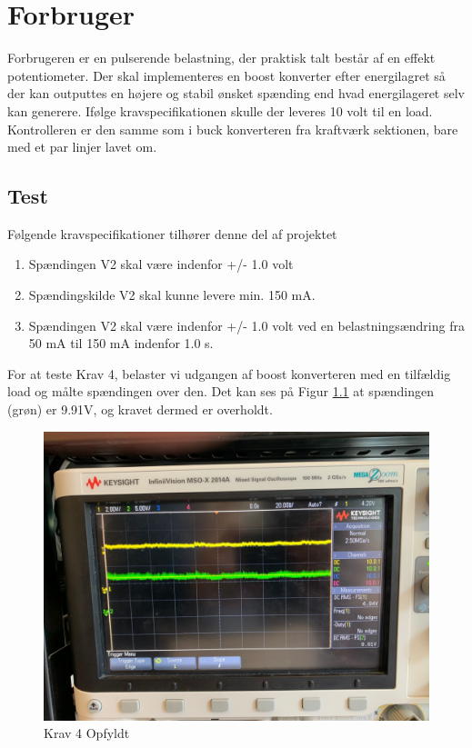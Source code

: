 \documentclass[../main.tex]{subfiles}
\begin{document}
\chapter{Forbruger} \label{Chap:Forbruger}
Forbrugeren er en pulserende belastning, der praktisk talt består af en effekt potentiometer. Der skal implementeres en boost konverter efter energilagret så der kan outputtes en højere og stabil ønsket spænding end hvad energilageret selv kan generere. Ifølge kravspecifikationen skulle der leveres 10 volt til en load. Kontrolleren er den samme som i buck konverteren fra kraftværk sektionen, bare med et par linjer lavet om. 

\section{Test}
Følgende kravspecifikationer tilhører denne del af projektet
\begin{enumerate}
  \item Spændingen V2 skal være indenfor +/- 1.0 volt
  \item Spændingskilde V2 skal kunne levere min. 150 mA.
  \item Spændingen V2 skal være indenfor +/- 1.0 volt ved en belastningsændring fra 50 mA til 150 mA indenfor 1.0 s.
\end{enumerate}

For at teste Krav 4, belaster vi udgangen af boost konverteren med en tilfældig load og målte spændingen over den. Det kan ses på Figur \ref{fig: Krav 4 Opfyldt} at spændingen (grøn) er 9.91V, og kravet dermed er overholdt.
\begin{figure}[H]
      \includegraphics[width=\textwidth]{Dokumentation/Pictures/Krav4.jpg}
     \caption{Krav 4 Opfyldt}
     \label{fig: Krav 4 Opfyldt}
     \end{figure}
\end{document}
